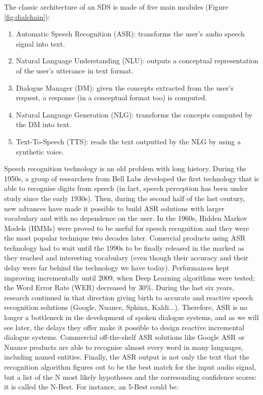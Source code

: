             The classic architecture of an SDS is made of five main modules (Figure \ref{fig:dialchain}):
            \begin{enumerate}
            	\item Automatic Speech Recognition (ASR): transforms the user's audio speech signal into text.
                \item Natural Language Understanding (NLU): outputs a conceptual representation of the user's utterance in text format.
                \item Dialogue Manager (DM): given the concepts extracted from the user's request, a response (in a conceptual format too) is computed.
                \item Natural Language Generation (NLG): transforms the concepts computed by the DM into text.
                \item Text-To-Speech (TTS): reads the text outputted by the NLG by using a synthetic voice.
            \end{enumerate}

            Speech recognition technology is an old problem with long history. During the 1950s, a group of researchers from Bell Labs developed the first technology that is able to recognise digits from speech (in fact, speech perception has been under study since the early 1930s). Then, during the second half of the last century, new advances have made it possible to build ASR solutions with larger vocabulary and with no dependence on the user. In the 1960s, Hidden Markov Models (HMMs) were proved to be useful for speech recognition and they were the most popular technique two decades later. Comercial products using ASR technology had to wait until the 1990s to be finally released in the marked as they reached and interesting vocabulary (even though their accuracy and their delay were far behind the technology we have today). Performances kept improving incrementally until 2009, when Deep Learning algorithms were tested; the Word Error Rate (WER) decreased by 30\%. During the last six years, research continued in that direction giving birth to accurate and reactive speech recognition solutions (Google, Nuance, Sphinx, Kaldi...). Therefore, ASR is no longer a bottleneck in the development of spoken dialogue systems, and as we will see later, the delays they offer make it possible to design reactive incremental dialogue systems. Commercial off-the-shelf ASR solutions like Google ASR or Nuance products are able to recognise almost every word in many languages, including named entities. Finally, the ASR output is not only the text that the recognition algorithm figures out to be the best match for the input audio signal, but a list of the N most likely hypotheses and the corresonding confidence scores: it is called the N-Best. For instance, an 5-Best could be:

